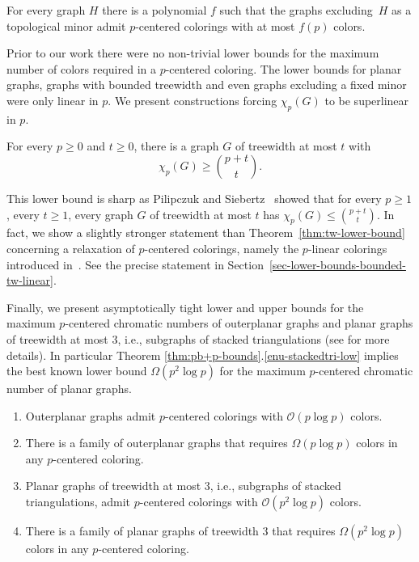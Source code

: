 \begin{theorem}\label{thm:topological-minors-sugar}
For every graph $H$ there is a polynomial $f$ such that 
the graphs excluding~$H$ as a topological minor admit $p$-centered
colorings with at most $f(p)$ colors.
\end{theorem}


Prior to our work there were no non-trivial lower bounds for the maximum number of 
colors required in a $p$-centered coloring.
The lower bounds for planar graphs, graphs with bounded treewidth and even 
graphs excluding a fixed minor were only linear in $p$.
We present constructions forcing $\chi_p(G)$ to be superlinear in $p$.
\begin{theorem}\label{thm:tw-lower-bound}
For every $p\geq0$ and $t\geq 0$, there is a graph $G$ of treewidth at most $t$ with
\[
\chi_p(G) \geq \textstyle \binom{p+t}{t}.
\]
\end{theorem}
This lower bound is sharp as Pilipczuk and Siebertz~\cite{PS19} showed 
that for every $p\geq1$, every $t\geq1$,
every graph $G$ of treewidth at most $t$ has $\chi_p(G)\leq \binom{p+t}{t}$.
In fact, we show a slightly stronger statement than Theorem~\ref{thm:tw-lower-bound} 
concerning a relaxation of $p$-centered colorings, 
namely the $p$-linear colorings introduced in~\cite{KBPS18}.
See the precise statement in Section~\ref{sec-lower-bounds-bounded-tw-linear}.

Finally, we present asymptotically tight lower and upper bounds for
the maximum $p$-centered chromatic numbers of outerplanar graphs 
and planar graphs of treewidth at most $3$, i.e., subgraphs of stacked triangulations (see \cite{KV12} for more details).
In particular Theorem \ref{thm:pb+p-bounds}.\ref{enu-stackedtri-low} implies the best known lower bound
$\Omega(p^2\log p)$ for the maximum $p$-centered chromatic number
of planar graphs.

\begin{theorem}\label{thm:pb+p-bounds}\hfill
\begin{enumerate}[label=\textup{(\roman*)},nosep]
\item Outerplanar graphs admit $p$-centered colorings with $\mathcal{O}(p\log p)$ colors.
\label{enu-outerplanar-up}
\item There is a family of outerplanar graphs that requires $\Omega(p\log p)$ colors in any $p$-centered coloring.
\label{enu-outerplanar-low}
\item Planar graphs of treewidth at most $3$, 
i.e., subgraphs of stacked triangulations, 
admit $p$-centered colorings with $\mathcal{O}(p^2\log p)$ colors.
\label{enu-stackedtri-up}
\item There is a family of planar graphs of treewidth $3$ that requires $\Omega(p^2\log p)$ colors in any $p$-centered coloring.
\label{enu-stackedtri-low}
\end{enumerate}
\label{thm:planarclasses}
\end{theorem}

